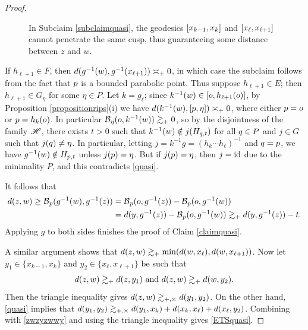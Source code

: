 {\begin{proof}
\begin{subproof}
\begin{figure}
\begin{center}
\caption{In Subclaim \ref{subclaimquasi}, the geodesics $[x_{k - 1},x_k]$ and $[x_\ell,x_{\ell + 1}]$ cannot penetrate the same cusp, thus guaranteeing some distance between $z$ and $w$.}
\label{figurequasi}
\end{center}
\end{figure}
\begin{subproof}
If $h_{\ell + 1}\in F$, then $d(g^{-1}(w),g^{-1}(x_{\ell + 1})) \asymp_+ 0$, in which case the subclaim follows from the fact that $p$ is a bounded parabolic point. Thus suppose $h_{\ell + 1}\in E$; then $h_{\ell + 1}\in G_\eta$ for some $\eta\in P$. Let $k = g_\ell$; since $k^{-1}(w)\in [o,h_{\ell + 1}(o)]$, by Proposition \ref{propositionrips}(i) we have $d(k^{-1}(w),[p,\eta]) \asymp_+ 0$, where either $p = o$ or $p = h_k(o)$. In particular $\operatorname{\mathcal B}_\eta(o,k^{-1}(w))\gtrsim_+ 0$, so by the disjointness of the family $\mathscr H$, there exists $t > 0$ such that $k^{-1}(w)\notin j(H_{q,t})$ for all $q\in P$ and $j\in G$ such that $j(q)\neq \eta$. In particular, letting $j = k^{-1} g = (h_k\cdots h_\ell)^{-1}$ and $q = p$, we have $g^{-1}(w)\notin H_{p,t}$ unless $j(p) = \eta$. But if $j(p) = \eta$, then $j = \mathrm{id}$ due to the minimality $P$, and this contradicts \eqref{quasi}.
\end{subproof}
It follows that
\begin{align*}
d(z,w) \geq \operatorname{\mathcal B}_p(g^{-1}(w),g^{-1}(z))
&= \operatorname{\mathcal B}_p(o,g^{-1}(z)) - \operatorname{\mathcal B}_p(o,g^{-1}(w))\\
&= d(y,g^{-1}(z)) - \operatorname{\mathcal B}_p(o,g^{-1}(w)) \gtrsim_+ d(y,g^{-1}(z)) - t.
\end{align*}
Applying $g$ to both sides finishes the proof of Claim \ref{claimquasi}.
\end{subproof}

A similar argument shows that $d(z,w)\gtrsim_+ \min(d(w,x_\ell),d(w,x_{\ell + 1}))$. Now let $y_1\in \{x_{k - 1},x_k\}$ and $y_2\in \{x_\ell,x_{\ell + 1}\}$ be such that
\begin{equation}
\label{zwzyzwwy}
d(z,w) \gtrsim_+ d(z,y_1) \textup{ and } d(z,w) \gtrsim_+ d(w,y_2).
\end{equation}
Then the triangle inequality gives $d(z,w)\gtrsim_{+,\times} d(y_1,y_2)$. On the other hand, \eqref{quasi} implies that $d(y_1,y_2) \gtrsim_{+,\times} d(y_1,x_k) + d(x_k,x_\ell) + d(x_\ell,y_2)$. Combining with \eqref{zwzyzwwy} and using the triangle inequality gives \eqref{ETSquasi}.
\end{proof}

}

